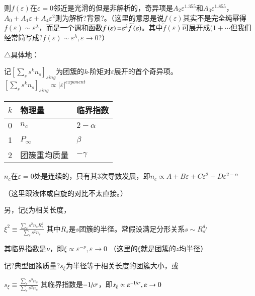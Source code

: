 \documentclass{article} %
\begin{document}
\noindent 则$f\left(\varepsilon \right)$在$\varepsilon =0$邻近是光滑的但是非解析的，奇异项是$A_{2} \varepsilon ^{1.355} $和$A_{3} \varepsilon ^{1.855} $，$A_{0} +A_{1} \varepsilon +A_{4} \varepsilon ^{2} $则为解析?背景?。（这里的意思是说$f\left(\varepsilon \right)$其实不是完全纯幂得$f\left(\varepsilon \right)\sim \varepsilon ^{\lambda } $，而是一个调和函数$f\left(\varepsilon \right){\rm =}\varepsilon ^{\lambda } \widetilde{f}\left(\varepsilon \right)$。其中$\widetilde{f}\left(\varepsilon \right)$可展开成$(1+\cdots $但我们经常简写成?$f\left(\varepsilon \right)\sim \varepsilon ^{\lambda } ,\varepsilon \to 0$?）

\noindent $\mathrm{\triangle}$具体地：

\noindent 记$\left[\sum _{s}s^{k} n_{s}  \right]_{\mathit{sing}} $为团簇的\textit{k}-阶矩对$\varepsilon $展开的首个奇异项。$\left[\sum _{s}s^{k} n_{s}  \right]_{\mathit{sing}} \propto \left|\varepsilon \right|^{\mathit{exponent}} $

\begin{tabular}{|p{1.3in}|p{1.3in}|p{1.3in}|} \hline 
$k$ & 物理量 & 临界指数 \\ \hline 
0 & $n_{c} $ & $2-\alpha $ \\ \hline 
1 & $P_{\infty } $ & $\beta $ \\ \hline 
2 & 团簇重均质量 & $-\gamma $ \\ \hline 
\end{tabular}

$n_{c} $在$\varepsilon =0$处是连续的，只有其3次导数发展，即$n_{c} \propto A+B\varepsilon +C\varepsilon ^{2} +D\varepsilon ^{2-\alpha } $ 

\noindent （这里跟液体或自旋的对比不太直接。）

\noindent 另，记$\xi $为相关长度，

 $\xi ^{2} \equiv \frac{\sum _{s}s^{2} n_{s} R_{s}^{2}  }{\sum _{s}s^{2} n_{s}  } $ 其中$R_{s} $是$s$团簇的半径。常假设满足分形关系$s\sim R_{s}^{d_{f} } $ 

\noindent 其临界指数是$\nu $，即$\xi \propto \varepsilon ^{-\nu } ,\varepsilon \to 0$ （这里的$\xi $就是团簇的$z$均半径）

\noindent 记?典型团簇质量?$s_{\xi } $为半径等于相关长度的团簇大小，或

 $s_{\xi } \equiv \frac{\sum _{s}s^{3} n_{s}  }{\sum _{s}s^{2} n_{s}  } $ 其临界指数是${-1\mathord{\left/ {\vphantom {-1 \sigma }} \right. \kern-\nulldelimiterspace} \sigma } $，即$s_{\xi } \propto \varepsilon ^{{-1\mathord{\left/ {\vphantom {-1 \sigma }} \right. \kern-\nulldelimiterspace} \sigma } } ,\varepsilon \to 0$ 
\end{document}
